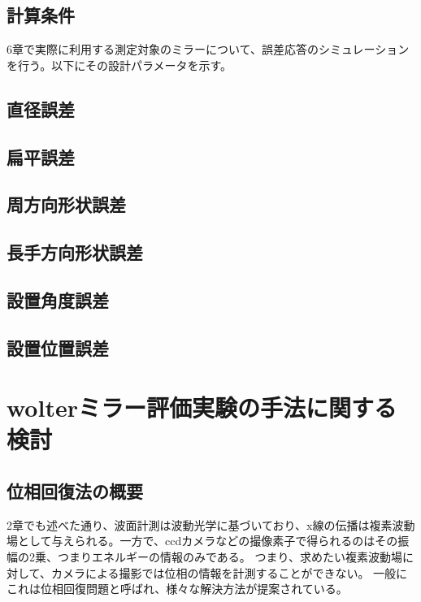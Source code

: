 \documentclass[dvipdfmx,autodetect-engine]{jreport}
\begin{document}
\section{計算条件}
6章で実際に利用する測定対象のミラーについて、誤差応答のシミュレーションを行う。以下にその設計パラメータを示す。




\section{直径誤差}

\section{扁平誤差}

\section{周方向形状誤差}

\section{長手方向形状誤差}

\section{設置角度誤差}

\section{設置位置誤差}

\newpage
\chapter{wolterミラー評価実験の手法に関する検討}
\minitoc

\newpage
\section{位相回復法の概要}
2章でも述べた通り、波面計測は波動光学に基づいており、x線の伝播は複素波動場として与えられる。一方で、ccdカメラなどの撮像素子で得られるのはその振幅の2乗、つまりエネルギーの情報のみである。
つまり、求めたい複素波動場に対して、カメラによる撮影では位相の情報を計測することができない。
一般にこれは位相回復問題と呼ばれ、様々な解決方法が提案されている。
\end{document}
